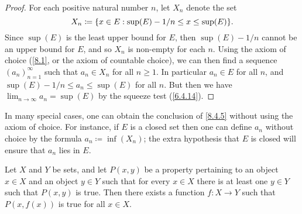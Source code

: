 \begin{proof}
  For each positive natural number \(n\), let \(X_n\) denote the set
  \[
    X_n \coloneqq \set{x \in E : \sup(E) - 1 / n \leq x \leq \sup(E)}.
  \]
  Since \(\sup(E)\) is the least upper bound for \(E\), then \(\sup(E) - 1 / n\) cannot be an upper bound for \(E\), and so \(X_n\) is non-empty for each \(n\).
  Using the axiom of choice (\cref{8.1}, or the axiom of countable choice), we can then find a sequence \((a_n)_{n = 1}^\infty\) such that \(a_n \in X_n\) for all \(n \geq 1\).
  In particular \(a_n \in E\) for all \(n\), and \(\sup(E) - 1 / n \leq a_n \leq \sup(E)\) for all \(n\).
  But then we have \(\lim_{n \to \infty} a_n = \sup(E)\) by the squeeze test (\cref{6.4.14}).
\end{proof}

\begin{rmk}\label{8.4.6}
  In many special cases, one can obtain the conclusion of \cref{8.4.5} without using the axiom of choice.
  For instance, if \(E\) is a closed set then one can define \(a_n\) without choice by the formula \(a_n \coloneqq \inf(X_n)\);
  the extra hypothesis that \(E\) is closed will ensure that \(a_n\) lies in \(E\).
\end{rmk}

\begin{prop}\label{8.4.7}
  Let \(X\) and \(Y\) be sets, and let \(P(x, y)\) be a property pertaining to an object \(x \in X\) and an object \(y \in Y\) such that for every \(x \in X\) there is at least one \(y \in Y\) such that \(P(x, y)\) is true.
  Then there exists a function \(f : X \to Y\) such that \(P(x, f(x))\) is true for all \(x \in X\).
\end{prop}

